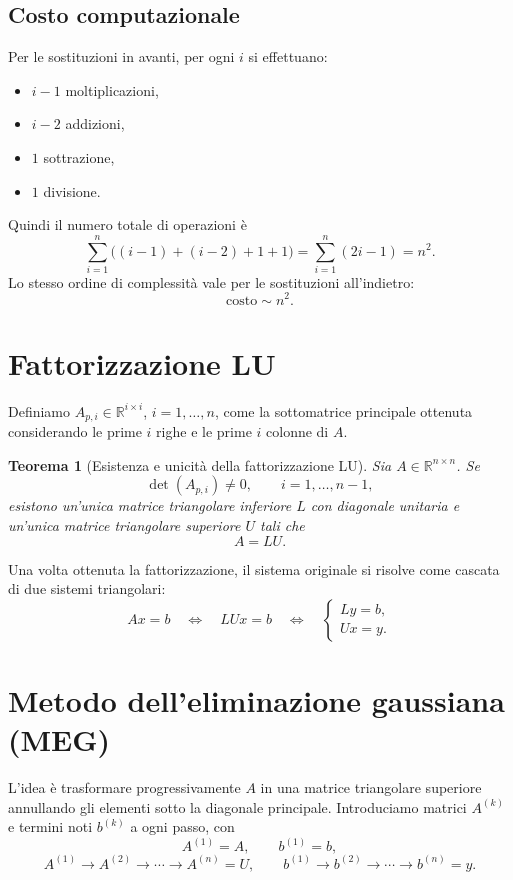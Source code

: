 \documentclass[11pt,a4paper]{report}
\newtheorem{theorem}{Teorema}[chapter]
\newcommand{\R}{\mathbb{R}}
\begin{document}
\subsection{Costo computazionale}
Per le sostituzioni in avanti, per ogni $i$ si effettuano:
\begin{itemize}
  \item $i-1$ moltiplicazioni,
  \item $i-2$ addizioni,
  \item $1$ sottrazione,
  \item $1$ divisione.
\end{itemize}
Quindi il numero totale di operazioni \`e
\[
\sum_{i=1}^n \big((i-1)+(i-2)+1+1\big)
=\sum_{i=1}^n (2i-1)=n^2.
\]
Lo stesso ordine di complessit\`a vale per le sostituzioni all'indietro:
\[
\text{costo} \sim n^2.
\]

\section{Fattorizzazione LU}
Definiamo $A_{p,i}\in\R^{i\times i}$, $i=1,\dots,n$, come la sottomatrice principale ottenuta considerando le prime $i$ righe e le prime $i$ colonne di $A$.

\begin{theorem}[Esistenza e unicit\`a della fattorizzazione LU]
Sia $A\in\R^{n\times n}$. Se
\[
\det(A_{p,i})\neq 0, \qquad i=1,\dots,n-1,
\]
esistono un'unica matrice triangolare inferiore $L$ con diagonale unitaria e un'unica matrice triangolare superiore $U$ tali che
\[
A=LU.
\]
\end{theorem}

Una volta ottenuta la fattorizzazione, il sistema originale si risolve come cascata di due sistemi triangolari:
\[
Ax=b
\quad \Longleftrightarrow \quad
LUx=b
\quad \Longleftrightarrow \quad
\begin{cases}
Ly=b,\\
Ux=y.
\end{cases}
\]

\section{Metodo dell'eliminazione gaussiana (MEG)}
L'idea \`e trasformare progressivamente $A$ in una matrice triangolare superiore annullando gli elementi sotto la diagonale principale.
Introduciamo matrici $A^{(k)}$ e termini noti $b^{(k)}$ a ogni passo, con
\[
A^{(1)}=A,
\qquad
b^{(1)}=b,
\]
\[
A^{(1)}\to A^{(2)}\to\cdots\to A^{(n)}=U,
\qquad
b^{(1)}\to b^{(2)}\to\cdots\to b^{(n)}=y.
\]
\end{document}
